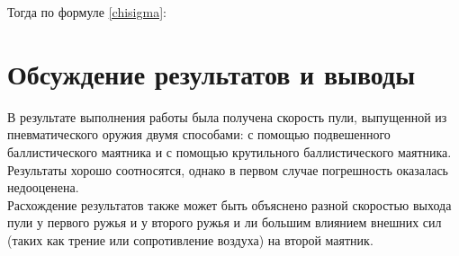 \documentclass[a4paper,12pt]{article}
\begin{document}
	Тогда по формуле \eqref{chisigma}:

	\begin{center}
	\end{center}
	
	\section{Обсуждение результатов и выводы}
	В результате выполнения работы была получена скорость пули, выпущенной из пневматического оружия двумя способами: с помощью подвешенного баллистического маятника и с помощью крутильного баллистического маятника. Результаты хорошо соотносятся, однако в первом случае погрешность оказалась недооценена.\\
	
	Расхождение результатов также может быть объяснено разной скоростью выхода пули у первого ружья и у второго ружья и ли большим влиянием внешних сил (таких как трение или сопротивление воздуха) на второй маятник.
	
	
	
\end{document}
